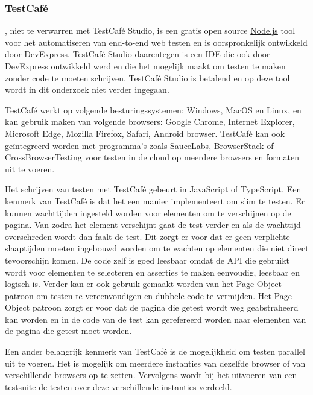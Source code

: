 \subsubsection{TestCafé}
\textcite{Testcafe}, niet te verwarren met TestCafé Studio, is een  gratis open source \hyperref[nodejs]{Node.js} \gls{tool} voor het automatiseren van end-to-end web testen en is oorspronkelijk ontwikkeld door DevExpress. TestCafé Studio daarentegen is een \gls{IDE} die ook door DevExpress ontwikkeld werd en die het mogelijk maakt om testen te maken zonder code te moeten schrijven. TestCafé Studio is betalend en op deze \gls{tool} wordt in dit onderzoek niet verder ingegaan.

TestCafé werkt op volgende besturingssystemen: Windows, MacOS en Linux, en kan gebruik maken van volgende browsers: Google Chrome, Internet Explorer, Microsoft Edge, Mozilla Firefox, Safari, Android browser. TestCafé kan ook geïntegreerd worden met programma's zoals SauceLabs, BrowserStack of CrossBrowserTesting voor testen in de cloud op meerdere browsers en formaten uit te voeren.

Het schrijven van testen met TestCafé gebeurt in JavaScript of \gls{TypeScript}.  Een kenmerk van TestCafé is dat het een manier implementeert om slim te testen. Er kunnen wachttijden ingesteld worden voor elementen om te verschijnen op de pagina. Van zodra het element verschijnt gaat de test verder en als de wachttijd overschreden wordt dan faalt de test. Dit zorgt er voor dat er geen verplichte slaaptijden moeten ingebouwd worden om te wachten op elementen die niet direct tevoorschijn komen. De code zelf is goed leesbaar omdat de \gls{API} die gebruikt wordt voor elementen te selecteren en \glspl{assertie} te maken eenvoudig, leesbaar en logisch is. Verder kan er ook gebruik gemaakt worden van het Page Object patroon om testen te vereenvoudigen en dubbele code te vermijden. Het Page Object patroon zorgt er voor dat de pagina die getest wordt weg geabstraheerd kan worden en in de code van de test kan gerefereerd worden naar elementen van de pagina die getest moet worden. 

Een ander belangrijk kenmerk van TestCafé is de mogelijkheid om testen parallel uit te voeren. Het is mogelijk om meerdere instanties van dezelfde browser of van verschillende browsers op te zetten. Vervolgens wordt bij het uitvoeren van een \gls{testsuite} de testen over deze verschillende instanties verdeeld.

